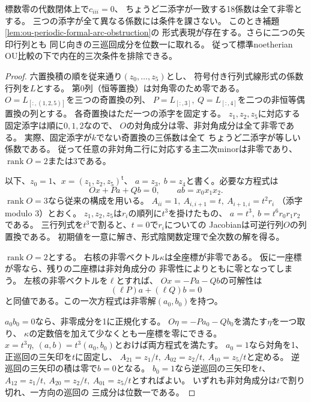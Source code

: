 \begin{lemma}[対角三零の形式曲線の一般構成]
\label{lem:ou-diagonal-zero-arc-lifting}
標数零の代数閉体上で$c_{iii}=0$、
ちょうど二添字が一致する18係数は全て非零とする。
三つの添字が全て異なる係数には条件を課さない。
このとき補題\ref{lem:ou-periodic-formal-arc-obstruction}の
形式表現が存在する。さらに二つの矢印行列とも
同じ向きの三巡回成分を位数一に取れる。
従って標準noetherian OU比較の下で内在的三次条件を排除できる。
\end{lemma}
\begin{proof}
六置換積の順を従来通り$(z_0,\ldots,z_5)$とし、
符号付き行列式線形式の係数行列を$L$とする。
第0列（恒等置換）は対角零のため零である。
$O=L_{[:,(1,2,5)]}$を三つの奇置換の列、
$P=L_{[:,3]},\ Q=L_{[:,4]}$を二つの非恒等偶置換の列とする。
各奇置換はただ一つの添字を固定する。
$z_1,z_2,z_5$に対応する固定添字は順に$0,1,2$なので、
$O$の対角成分は零、非対角成分は全て非零である。
実際、固定添字が$k$でない奇置換の三係数は全て
ちょうど二添字が等しい係数である。
従って任意の非対角二行に対応する主二次minorは非零であり、
$\operatorname{rank} O=2$または3である。

以下、$z_0=1$、$x=(z_1,z_2,z_5)^{\mathsf t}$、
$a=z_3,\ b=z_4$と書く。必要な方程式は
\[
 Ox+Pa+Qb=0,\qquad ab=x_0x_1x_2.
\]
$\operatorname{rank} O=3$なら従来の構成を用いる。
$A_{ii}=1,\ A_{i,i+1}=t,\ A_{i+1,i}=t^2r_i$
（添字modulo 3）とおく。
$z_1,z_2,z_5$は$r_i$の順列に$t^3$を掛けたもの、
$a=t^3,\ b=t^6r_0r_1r_2$である。
三行列式を$t^3$で割ると、$t=0$で$r_i$についての
Jacobianは可逆行列$O$の列置換である。
初期値を一意に解き、形式陰関数定理で全次数の解を得る。

$\operatorname{rank} O=2$とする。
右核の非零ベクトル$\kappa$は全座標が非零である。
仮に一座標が零なら、残りの二座標は非対角成分の
非零性によりともに零となってしまう。
左核の非零ベクトルを$\ell$とすれば、
$Ox=-Pa-Qb$の可解性は
\[
 (\ell P)a+(\ell Q)b=0
\]
と同値である。この一次方程式は非零解$(a_0,b_0)$を持つ。

$a_0b_0=0$なら、非零成分を1に正規化する。
$O\eta=-Pa_0-Qb_0$を満たす$\eta$を一つ取り、
$\kappa$の定数倍を加えて少なくとも一座標を零にできる。
$x=t^3\eta,\ (a,b)=t^3(a_0,b_0)$とおけば両方程式を満たす。
$a_0=1$なら対角を1、正巡回の三矢印を$t$に固定し、
$A_{21}=z_1/t,\ A_{02}=z_2/t,\ A_{10}=z_5/t$と定める。
逆巡回の三矢印の積は零で$b=0$となる。
$b_0=1$なら逆巡回の三矢印を$t$、
$A_{12}=z_1/t,\ A_{20}=z_2/t,\ A_{01}=z_5/t$とすればよい。
いずれも非対角成分は$t$で割り切れ、一方向の巡回の
三成分は位数一である。


\end{proof}
